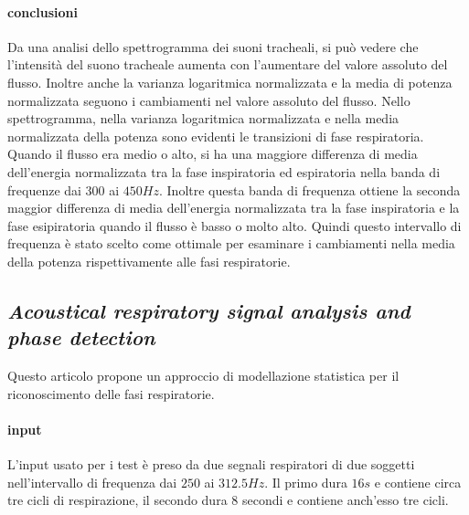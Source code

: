 \begin{frame}
    \paragraph{conclusioni}
      Da una analisi dello spettrogramma dei suoni tracheali, si pu\`o vedere che l'intensit\`a del suono tracheale aumenta con l'aumentare del valore assoluto del flusso. 
      Inoltre anche la varianza logaritmica normalizzata e la media di potenza normalizzata seguono i cambiamenti nel valore assoluto del flusso. 
      Nello spettrogramma, nella varianza logaritmica normalizzata e nella media normalizzata della potenza sono evidenti le transizioni di fase respiratoria. 
      Quando il flusso era medio o alto, si ha una maggiore differenza di media dell'energia normalizzata tra la fase inspiratoria ed espiratoria nella banda di frequenze dai $300$ ai $450Hz$. 
      Inoltre questa banda di frequenza ottiene la seconda maggior differenza di media dell'energia normalizzata tra la fase inspiratoria e la fase esipiratoria quando il flusso \`e basso o molto alto. 
      Quindi questo intervallo di frequenza \`e stato scelto come ottimale per esaminare i cambiamenti nella media della potenza rispettivamente alle fasi respiratorie.

  
  \subsection[Acoustical respiratory signal analysis and phase detection]{ \textit{Acoustical respiratory signal analysis and phase detection} \cite{ARSAPD}}

    Questo articolo propone un approccio di modellazione statistica per il riconoscimento delle fasi respiratorie.
    \paragraph{input}
      L'input usato per i test \`e preso da due segnali respiratori di due soggetti nell'intervallo di frequenza dai $250$ ai $312.5Hz$. 
      Il primo dura $16s$ e contiene circa tre cicli di respirazione, il secondo dura $8$ secondi e contiene anch'esso tre cicli. 

\end{frame}

